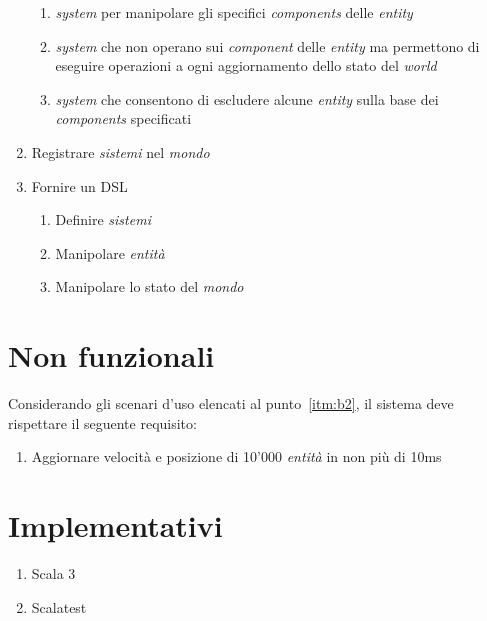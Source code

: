 \begin{enumerate}[label=\textbf{\ref{sec:funzionali}.\arabic*}]
    \begin{enumerate}[label=\textbf{\ref{itm:f7}.\arabic*}]
        \item \label{itm:ff7} \textit{system} per manipolare gli specifici \textit{components} delle \textit{entity}
        \item \label{itm:ff10} \textit{system} che non operano sui \textit{component} delle \textit{entity} ma permettono di eseguire operazioni a ogni aggiornamento dello stato del \textit{world}
        \item \label{itm:ff11} \textit{system} che consentono di escludere alcune \textit{entity} sulla base dei \textit{components} specificati
    \end{enumerate}
    \item \label{itm:f8} Registrare \textit{sistemi} nel \textit{mondo}
    \item \label{itm:f9} Fornire un DSL
    \begin{enumerate}[label=\textbf{\ref{itm:f9}.\arabic*}]
        \item \label{itm:ff12} Definire \textit{sistemi}
        \item \label{itm:ff13} Manipolare \textit{entità}
        \item \label{itm:ff14} Manipolare lo stato del \textit{mondo}
    \end{enumerate}
\end{enumerate}


\section{Non funzionali}\label{sec:non-funzionali}
Considerando gli scenari d'uso elencati al punto~\ref{itm:b2}, il sistema deve rispettare il seguente requisito:
\begin{enumerate}[label=\textbf{\ref{sec:non-funzionali}.\arabic*}]
    \item \label{itm:nf1} Aggiornare velocità e posizione di 10'000 \textit{entità} in non più di 10ms
\end{enumerate}


\section{Implementativi}\label{sec:implementativi}
\begin{enumerate}[label=\textbf{\ref{sec:implementativi}.\arabic*}]
    \item \label{itm:i1} Scala 3
    \item \label{itm:i2} Scalatest
\end{enumerate}